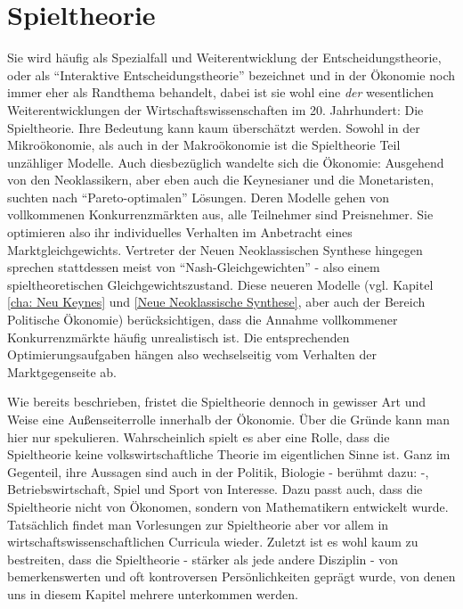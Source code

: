 %
%
%

\chapter{Spieltheorie} \label{cha: Spieltheorie}
\label{Spieltheorie}

Sie wird häufig als Spezialfall und Weiterentwicklung der Entscheidungstheorie, oder als "`Interaktive Entscheidungstheorie"' bezeichnet und in der Ökonomie noch immer eher als Randthema behandelt, dabei ist sie wohl eine \textit{der} wesentlichen Weiterentwicklungen der Wirtschaftswissenschaften im 20. Jahrhundert: Die Spieltheorie. Ihre Bedeutung kann kaum überschätzt werden. Sowohl in der Mikroökonomie, als auch in der Makroökonomie ist die Spieltheorie Teil unzähliger Modelle. Auch diesbezüglich wandelte sich die Ökonomie: Ausgehend von den Neoklassikern, aber eben auch die Keynesianer und die Monetaristen, suchten nach "`Pareto-optimalen"' Lösungen. Deren Modelle gehen von vollkommenen Konkurrenzmärkten aus, alle Teilnehmer sind Preisnehmer. Sie optimieren also ihr individuelles Verhalten im Anbetracht eines Marktgleichgewichts. Vertreter der Neuen Neoklassischen Synthese hingegen sprechen stattdessen meist von "`Nash-Gleichgewichten"' - also einem spieltheoretischen Gleichgewichtszustand.  Diese neueren Modelle (vgl. Kapitel \ref{cha: Neu Keynes} und \ref{Neue Neoklassische Synthese}, aber auch der Bereich Politische Ökonomie) berücksichtigen, dass die Annahme vollkommener Konkurrenzmärkte häufig unrealistisch ist. Die entsprechenden Optimierungsaufgaben hängen also wechselseitig vom Verhalten der Marktgegenseite ab. 

Wie bereits beschrieben, fristet die Spieltheorie dennoch in gewisser Art und Weise eine Außenseiterrolle innerhalb der Ökonomie. Über die Gründe kann man hier nur spekulieren. Wahrscheinlich spielt es aber eine Rolle, dass die Spieltheorie keine volkswirtschaftliche Theorie im eigentlichen Sinne ist. Ganz im Gegenteil, ihre Aussagen sind auch in der Politik, Biologie - berühmt dazu: \textcite{Price1973} -, Betriebswirtschaft, Spiel und Sport von Interesse. Dazu passt auch, dass die Spieltheorie nicht von Ökonomen, sondern von Mathematikern entwickelt wurde. Tatsächlich findet man Vorlesungen zur Spieltheorie aber vor allem in wirtschaftswissenschaftlichen Curricula wieder. Zuletzt ist es wohl kaum zu bestreiten, dass die Spieltheorie - stärker als jede andere Disziplin - von bemerkenswerten und oft kontroversen Persönlichkeiten geprägt wurde, von denen uns in diesem Kapitel mehrere unterkommen werden.

